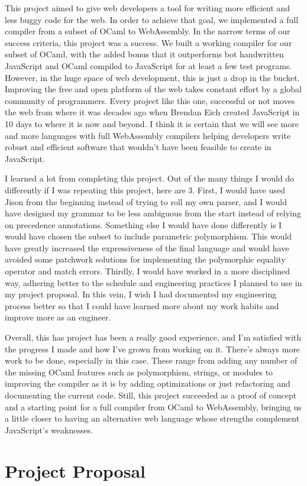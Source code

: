 \documentclass[12pt,a4paper,twoside,openright]{report}
\begin{document}
This project aimed to give web developers a tool for writing more efficient and less buggy code for the web.
In order to achieve that goal, we implemented a full compiler from a subset of OCaml to WebAssembly.
In the narrow terms of our success criteria, this project was a success.
We built a working compiler for our subset of OCaml, with the added bonus that it outperforms bot handwritten JavaScript and OCaml compiled to JavaScript for at least a few test programs.
However, in the huge space of web development, this is just a drop in the bucket.
Improving the free and open platform of the web takes constant effort by a global community of programmers.
Every project like this one, successful or not moves the web from where it was decades ago when Brendan Eich created JavaScript in 10 days to where it is now and beyond.
I think it is certain that we will see more and more languages with full WebAssembly compilers helping developers write robust and efficient software that wouldn't have been feasible to create in JavaScript.

I learned a lot from completing this project.
Out of the many things I would do differently if I was repeating this project, here are 3.
First, I would have used Jison from the beginning instead of trying to roll my own parser, and I would have designed my grammar to be less ambiguous from the start instead of relying on precedence annotations.
Something else I would have done differently is I would have chosen the subset to include parametric polymorphism.
This would have greatly increased the expressiveness of the final language and would have avoided some patchwork solutions for implementing the polymorphic equality operator and match errors.
Thirdly, I would have worked in a more disciplined way, adhering better to the schedule and engineering practices I planned to use in my project proposal.
In this vein, I wish I had documented my engineering process better so that I could have learned more about my work habits and improve more as an engineer.

Overall, this has project has been a really good experience, and I'm satisfied with the progress I made and how I've grown from working on it.
There's always more work to be done, especially in this case.
These range from adding any number of the missing OCaml features such as polymorphism, strings, or modules to improving the compiler as it is by adding optimizations or just refactoring and documenting the current code.
Still, this project succeeded as a proof of concept and a starting point for a full compiler from OCaml to WebAssembly, bringing us a little closer to having an alternative web language whose strengths complement JavaScript's weaknesses.



\appendix

\chapter{Project Proposal}


\end{document}
